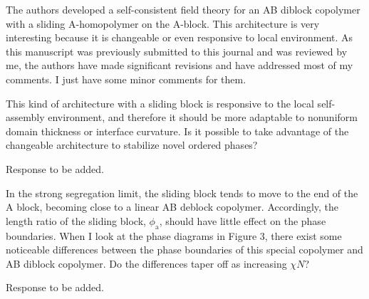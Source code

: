 \documentclass[../ResponsetoReviewers.tex]{subfiles}
\begin{document}
\begin{reviewersection}

\begin{reviewercomment}
    The authors developed a self-consistent field theory for an AB diblock copolymer with a sliding A-homopolymer on the A-block.
    This architecture is very interesting because it is changeable or even responsive to local environment.
    As this manuscript was previously submitted to this journal and was reviewed by me, the authors have made significant revisions and have addressed most of my comments.
    I just have some minor comments for them.
\end{reviewercomment}


\begin{qa}
    This kind of architecture with a sliding block is responsive to the local self-assembly environment, and therefore it should be more adaptable to nonuniform domain thickness or interface curvature.
    Is it possible to take advantage of the changeable architecture to stabilize novel ordered phases?
\end{qa}
\begin{reply}
    Response to be added.
\end{reply}


\begin{qa}
    In the strong segregation limit, the sliding block tends to move to the end of the A block, becoming close to a linear AB deblock copolymer.
    Accordingly, the length ratio of the sliding block, $\phi_{\mathrm a}$, should have little effect on the phase boundaries.
    When I look at the phase diagrams in Figure 3, there exist some noticeable differences between the phase boundaries of this special copolymer and AB diblock copolymer.
    Do the differences taper off as increasing $\chi N$?
\end{qa}
\begin{reply}
    Response to be added.
\end{reply}

\end{reviewersection}
\end{document}
